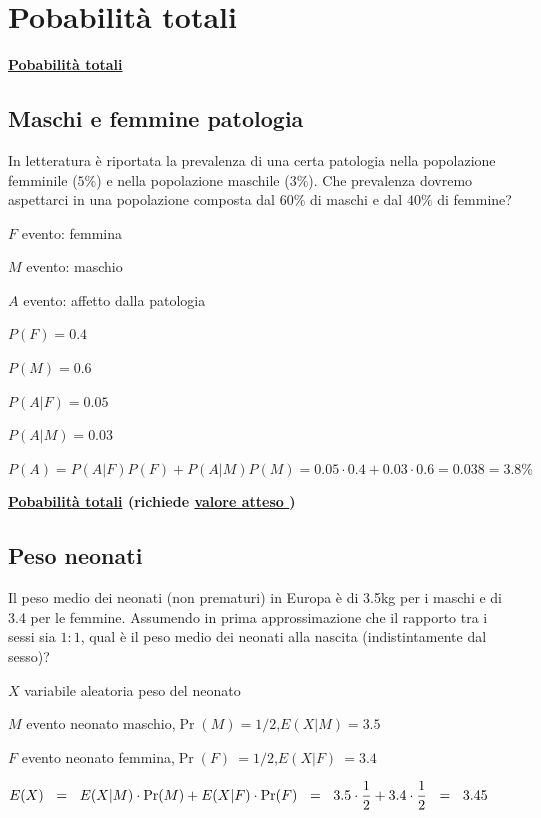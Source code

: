 \documentclass[11pt,openany]{book}
\begin{document}
\clearpage\section{Pobabilità totali}


\hfill\textbf{{\color{brown}\hyperref[TeoremaProbabilitaTotali]{Pobabilità totali} \faShare}}
\subsection{Maschi e femmine patologia}
\label{MF_totali}



In letteratura è riportata la prevalenza di una certa patologia nella popolazione femminile ($5\%$) e nella popolazione maschile ($3\%$). Che prevalenza dovremo aspettarci in una popolazione composta dal $60\%$ di maschi e dal $40\%$ di femmine?

$F$ evento: femmina

$M$ evento: maschio

$A$ evento: affetto dalla patologia

$P(F)=0.4$

$P(M)=0.6$

$P(A|F)=0.05$

$P(A|M)=0.03$

$P(A)=P(A|F)P(F)+P(A|M)P(M)=0.05\cdot0.4+0.03\cdot0.6=0.038=3.8\%$


\clearpage
\hfill\textbf{{\color{brown}\hyperref[TeoremaProbabilitaTotaliMedia]{Pobabilità totali} \faShare} (richiede \hyperref[ValoreAtteso]{valore atteso \faShare})}
\subsection{Peso neonati}
\label{Neonati_totali}

Il peso medio dei neonati (non prematuri) in Europa è di 3.5kg per i maschi e di 3.4 per le femmine. Assumendo in prima approssimazione che il rapporto tra i sessi sia $1:1$, qual è il peso medio dei neonati alla nascita (indistintamente dal sesso)?

$X$ variabile aleatoria peso del neonato

$M$ evento neonato maschio,\quad $\Pr(M)=1/2$,\quad $E(X|M)=3.5$

$F$ evento neonato femmina,\quad $\Pr(F)\ =1/2$,\quad $E(X|F)\ =3.4$


$E(X)\medrel{=}E(X|M)\cdot\Pr(M)+ E(X|F)\cdot\Pr(F)\medrel{=}3.5\cdot\dfrac12 + 3.4\cdot\dfrac12\medrel{=}3.45$
\end{document}
